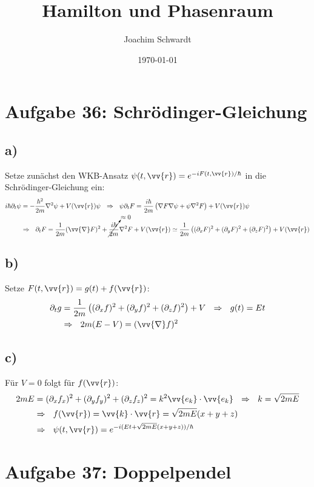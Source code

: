 \documentclass[a4paper,12pt]{article}
\begin{document}
\title{Hamilton und Phasenraum}
\author{Joachim Schwardt}
\date{\today}
\maketitle

\section*{Aufgabe 36: Schrödinger-Gleichung}
\subsection*{a)} Setze zunächst den WKB-Ansatz $\psi(t, \vv{r})=e^{-iF(t, \vv{r})/\hbar}$ in die Schrödinger-Gleichung ein:
\begin{align*}
i\hbar \partial_t\psi&=-\frac{\hbar^2}{2m}\nabla^2\psi+V(\vv{r})\psi \ \ \Rightarrow\ \ \psi\partial_tF=\frac{i\hbar}{2m}\left(\nabla F\nabla\psi + \psi\nabla^2 F  \right)+V(\vv{r})\psi\\
&\Rightarrow\ \ \partial_t F=\frac{1}{2m}(\vv{\nabla} F)^2 +\cancelto{\approx 0}{\frac{i\hbar}{2m}}\nabla^2 F + V(\vv{r})\simeq\frac{1}{2m}\left((\partial_x F)^2+(\partial_y F)^2+(\partial_z F)^2\right) + V(\vv{r})
\end{align*}
\subsection*{b)} Setze $F(t, \vv{r})=g(t)+f(\vv{r})$:
\begin{align*}
\partial_t g&=\frac{1}{2m}\left( (\partial_x f)^2+(\partial_y f)^2+(\partial_z f)^2 \right)+V\ \ \Rightarrow\ \ g(t)=Et\\
&\Rightarrow\ \ 2m(E-V)=(\vv{\nabla}f)^2
\end{align*}
\subsection*{c)} Für $V=0$ folgt für $f(\vv{r})$:
\begin{align*}
2mE&=(\partial_xf_x)^2+(\partial_yf_y)^2+(\partial_zf_z)^2=k^2\vv{e_k}\cdot\vv{e_k}\ \ \Rightarrow\ \ k=\sqrt{2mE}\\
&\Rightarrow\ \ f(\vv{r})=\vv{k}\cdot\vv{r}=\sqrt{2mE}(x+y+z)\\
&\Rightarrow\ \ \psi(t, \vv{r})=e^{-i(Et+\sqrt{2mE}(x+y+z))/\hbar}
\end{align*}
\section*{Aufgabe 37: Doppelpendel}
\end{document}
